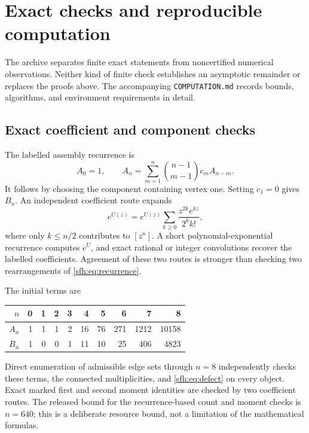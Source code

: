 \section{Exact checks and reproducible computation}\label{sfh:sec:computation}
The archive separates finite exact statements from noncertified numerical observations. Neither kind of finite check establishes an asymptotic remainder or replaces the proofs above. The accompanying \texttt{COMPUTATION.md} records bounds, algorithms, and environment requirements in detail.

\subsection{Exact coefficient and component checks}
The labelled assembly recurrence is
\begin{equation}\label{sfh:eq:recurrence}
 A_0=1,\qquad
 A_n=\sum_{m=1}^n\binom{n-1}{m-1}c_mA_{n-m}.
\end{equation}
It follows by choosing the component containing vertex one. Setting $c_1=0$ gives $B_n$. An independent coefficient route expands
\[
 e^{C(z)}=e^{U(z)}\sum_{k\ge0}\frac{z^{2k}e^{kz}}{2^kk!},
\]
where only $k\le n/2$ contributes to $[z^n]$. A short polynomial-exponential recurrence computes $e^U$, and exact rational or integer convolutions recover the labelled coefficients. Agreement of these two routes is stronger than checking two rearrangements of \eqref{sfh:eq:recurrence}.

\begin{samepage}
The initial terms are
\begin{center}
\begin{tabular}{r|rrrrrrrrr}
\toprule
$n$&0&1&2&3&4&5&6&7&8\\
\midrule
$A_n$&1&1&1&2&16&76&271&1212&10158\\
$B_n$&1&0&0&1&11&10&25&406&4823\\
\bottomrule
\end{tabular}
\end{center}
\end{samepage}
Direct enumeration of admissible edge sets through $n=8$ independently checks these terms, the connected multiplicities, and \eqref{sfh:eq:defect} on every object. Exact marked first and second moment identities are checked by two coefficient routes. The released bound for the recurrence-based count and moment checks is $n=640$; this is a deliberate resource bound, not a limitation of the mathematical formulas.

